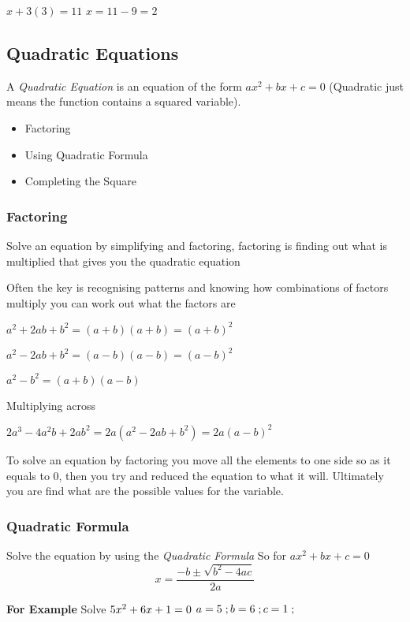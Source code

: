 \documentclass{article}
\begin{document}
$x + 3 (3) = 11$
$x = 11 -9 = 2$

\newpage
\subsection{Quadratic Equations}
A \textit{Quadratic Equation} is an equation of the form $ax^{2} + bx + c = 0$ (Quadratic just means the function contains a squared variable).

\begin{itemize}
\item Factoring
\item Using Quadratic Formula
\item Completing the Square
\end{itemize}

\subsubsection{Factoring}
Solve an equation by simplifying and factoring, factoring is finding out what is multiplied that gives you the quadratic equation

Often the key is recognising patterns and knowing how combinations of factors multiply you can work out what the factors are 

$a^{2} + 2ab + b^{2} = (a + b) (a + b)  = (a + b)^{2}$

$a^{2} - 2ab + b^{2} = (a - b) (a - b)  = (a - b)^{2}$

$a^{2} - b^{2} = (a + b) (a - b)$


Multiplying across

$2a^{3} -4a^{2}b + 2ab^{2} = 2a ( a^{2} - 2ab + b^{2} ) = 2a (a-b)^{2}$

To solve an equation by factoring you move all the elements to one side so as it equals to 0,
then you try and reduced the equation to what it will.
Ultimately you are find what are the possible values for the variable.


\subsubsection{Quadratic Formula}
Solve the equation by using the \textit{Quadratic Formula}  
So for $ax^{2} + bx + c = 0$
\begin{equation}
x = \frac{-b \pm \sqrt{b^{2}-4ac}}{2a}
\end{equation}

\textbf{For Example} 
Solve $5x^{2} + 6x + 1 = 0\\$
$a = 5\;; b = 6\;; c = 1\;;\\$
\end{document}
